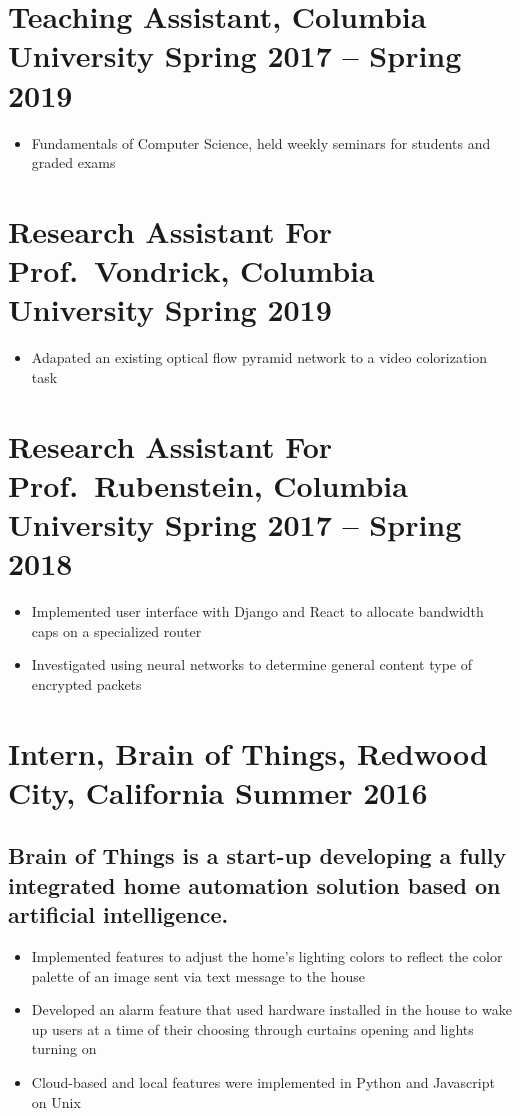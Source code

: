 \documentclass{article}
\begin{document}
\section*{\textbf{Teaching Assistant, Columbia University \hfill	Spring 2017 -- Spring 2019 }}
\begin{itemize}
    \item Fundamentals of Computer Science, held weekly seminars for students and graded exams
\end{itemize}

\section*{\textbf{Research Assistant For Prof.\ Vondrick, Columbia University \hfill	Spring 2019}}
\begin{itemize}[noitemsep]
    \item Adapated an existing optical flow pyramid network to a video colorization task
\end{itemize}
 
\section*{\textbf{Research Assistant For Prof.\ Rubenstein, Columbia University \hfill	Spring 2017 -- Spring 2018}}
\begin{itemize}[noitemsep]
    \item Implemented user interface with Django and React to allocate bandwidth caps on a specialized router
    \item Investigated using neural networks to determine general content type of encrypted packets
\end{itemize}

\section*{\textbf{Intern, Brain of Things, Redwood City, California	\hfill Summer 2016}}
\subsection*{Brain of Things is a start-up developing a fully integrated home automation solution based on artificial intelligence. }
\begin{itemize}[noitemsep]
    \item Implemented features to adjust the home's lighting colors to reflect the color palette of an image sent via text message to the house 
    \item Developed an alarm feature that used hardware installed in the house to wake up users at a time of their choosing through curtains opening and lights turning on
    \item Cloud-based and local features were implemented in Python and Javascript on Unix
\end{itemize}
\end{document}
